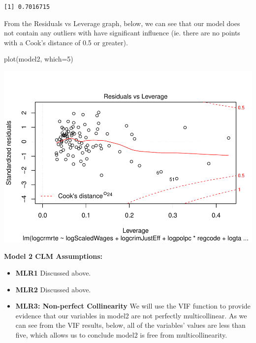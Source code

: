 \documentclass[]{article}
\newenvironment{Shaded}{}{}
\newcommand{\DataTypeTok}[1]{#1}
\newcommand{\DecValTok}[1]{#1}
\newcommand{\KeywordTok}[1]{\textcolor[rgb]{0.00,0.00,1.00}{#1}}
\newcommand{\NormalTok}[1]{#1}
\newcommand{\OperatorTok}[1]{#1}
\begin{document}
\begin{Shaded}
\end{Shaded}

\begin{verbatim}
[1] 0.7016715
\end{verbatim}

From the Residuals vs Leverage graph, below, we can see that our model
does not contain any outliers with have significant influence (ie. there
are no points with a Cook's distance of 0.5 or greater).

\begin{Shaded}
\begin{Highlighting}[]
\KeywordTok{plot}\NormalTok{(model2, }\DataTypeTok{which=}\DecValTok{5}\NormalTok{) }
\end{Highlighting}
\end{Shaded}

\includegraphics{Bagnard_Gaustad_Hartman_Leung_Lab_3_files/figure-latex/unnamed-chunk-72-1.pdf}

\textbf{Model 2 CLM Assumptions:}

\begin{itemize}
\item
  \textbf{MLR1} Discussed above.
\item
  \textbf{MLR2} Discussed above.
\item
  \textbf{MLR3: Non-perfect Collinearity} We will use the VIF function
  to provide evidence that our variables in model2 are not perfectly
  multicollinear. As we can see from the VIF results, below, all of the
  variables' values are less than five, which allows us to conclude
  model2 is free from multicollinearity.
\end{itemize}
\end{document}
